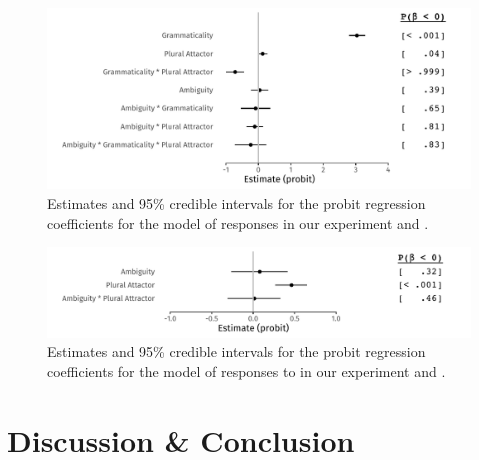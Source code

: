 \documentclass[apacite,linguex]{glossa}\usepackage[]{graphicx}\usepackage[]{color}
\makeatletter
\def\maxwidth{ %
  \ifdim\Gin@nat@width>\linewidth
    \linewidth
  \else
    \Gin@nat@width
  \fi
}
\newenvironment{knitrout}{}{} %
\makeatother
\begin{document}
\begin{figure}[hbt!]
\centering


\begin{knitrout}
\color{fgcolor}

{\centering \includegraphics[width=\maxwidth]{figure/ResponseModel-1} 

}


\end{knitrout}

\caption{Estimates and 95\% credible intervals for the probit regression coefficients for the model of responses in our experiment and \citet{LagoEtAl:2019}.}
\label{fig:ResponseModel}
\end{figure}


\begin{figure}[hbt!]
\centering


\begin{knitrout}
\color{fgcolor}

{\centering \includegraphics[width=\maxwidth]{figure/ResponseModelUngram-1} 

}


\end{knitrout}

\caption{Estimates and 95\% credible intervals for the probit regression coefficients for the model of responses to  in our experiment and \citet{LagoEtAl:2019}.}
\label{fig:ResponseModelUngram}
\end{figure}


\section{Discussion \& Conclusion}
\end{document}
